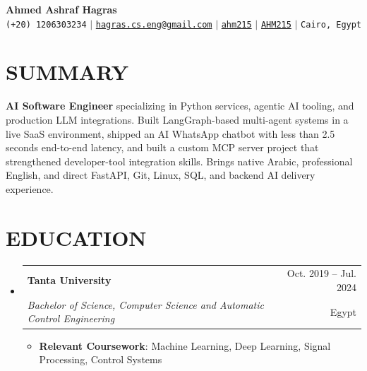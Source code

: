 \documentclass[letterpaper,11pt]{article}
\makeatletter
\newcommand{\resumeItem}[1]{
  \item\small{
    {#1 \vspace{-1pt}}
  }
}
\newcommand{\resumeSubheading}[4]{
  \vspace{-1pt}\item
    \begin{tabular*}{\textwidth}[t]{l@{\extracolsep{\fill}}r}
      \textbf{#1} & {\color{dark-grey}\small #2}\vspace{1pt}\\
      \textit{#3} & {\color{dark-grey} \small #4}\\
    \end{tabular*}\vspace{-4pt}
}
\newcommand{\resumeSubHeadingListStart}{\begin{itemize}[leftmargin=0in, label={}]}
\newcommand{\resumeSubHeadingListEnd}{\end{itemize}}
\newcommand{\resumeItemListStart}{\begin{itemize}}
\newcommand{\resumeItemListEnd}{\end{itemize}\vspace{0pt}}
\makeatother
\begin{document}
\begin{center}
    \textbf{\Huge Ahmed Ashraf Hagras} \\ \vspace{5pt}
    \small \faPhone* \texttt{(+20) 1206303234} \hspace{1pt} $|$
    \hspace{1pt} \faEnvelope \hspace{2pt} \href{mailto:hagras.cs.eng@gmail.com}{\texttt{hagras.cs.eng@gmail.com}} \hspace{1pt} $|$
    \hspace{1pt} \faLinkedin \hspace{2pt} \href{https://www.linkedin.com/in/ahm215}{\texttt{ahm215}} \hspace{1pt} $|$
    \hspace{1pt} \faGithub \hspace{2pt} \href{https://github.com/AHM215}{\texttt{AHM215}} \hspace{1pt} $|$
    \hspace{1pt} \faMapMarker* \hspace{2pt}\texttt{Cairo, Egypt}
    \\ \vspace{-3pt}
\end{center}

\section{SUMMARY}
\small{
\textbf{AI Software Engineer} specializing in Python services, agentic AI tooling, and production LLM integrations. Built LangGraph-based multi-agent systems in a live SaaS environment, shipped an AI WhatsApp chatbot with less than 2.5 seconds end-to-end latency, and built a custom MCP server project that strengthened developer-tool integration skills. Brings native Arabic, professional English, and direct FastAPI, Git, Linux, SQL, and backend AI delivery experience.
}

\section{EDUCATION}
  \resumeSubHeadingListStart
    \resumeSubheading
      {Tanta University}{Oct. 2019 -- Jul. 2024}
      {Bachelor of Science, Computer Science and Automatic Control Engineering}{Egypt}
      \resumeItemListStart
        \resumeItem{\textbf{Relevant Coursework}: Machine Learning, Deep Learning, Signal Processing, Control Systems}
      \resumeItemListEnd
  \resumeSubHeadingListEnd
\end{document}

